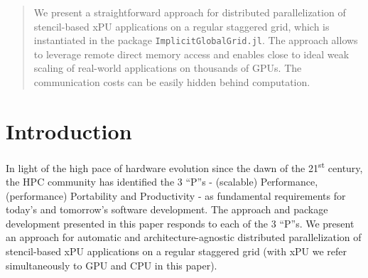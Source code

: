\documentclass{juliacon}
\newcommand{\ts}{\textsuperscript}
\begin{document}


\maketitle

\begin{abstract}

We present a straightforward approach for distributed parallelization of stencil-based xPU applications on a regular staggered grid, which is instantiated in the package \texttt{ImplicitGlobalGrid.jl}. The approach allows to leverage remote direct memory access and enables close to ideal weak scaling of real-world applications on thousands of GPUs. The communication costs can be easily hidden behind computation.

\end{abstract}

\section{Introduction}
 In light of the high pace of hardware evolution since the dawn of the 21\ts{st} century, the HPC community has identified the 3 ``P''s - (scalable) Performance, (performance) Portability and Productivity - as fundamental requirements for today's and tomorrow's software development. The approach and package development presented in this paper responds to each of the 3 ``P''s. We present an approach for automatic and architecture-agnostic distributed parallelization of stencil-based xPU applications on a regular staggered grid (with xPU we refer simultaneously to GPU and CPU in this paper). 
\end{document}
